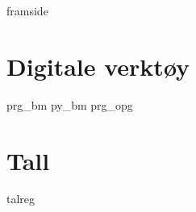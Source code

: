 




\addto\captionsenglish{\renewcommand{\figurename}{Figur}}
\makeatletter
\addto\captionsenglish{\renewcommand{\chaptername}{Kapittel}}
\addto\captionsenglish{\renewcommand{\contentsname}{Innhold}}

\renewcommand{\thesection}{\thechapter.\Alph{section}}


{framside}
\newpage
\tableofcontents
\setcounter{chapter}{-1}
\chapter{Digitale verktøy \label{Dig}}
{prg_bm}
{py_bm}
{prg_opg}

\chapter{Tall}
{talreg}







